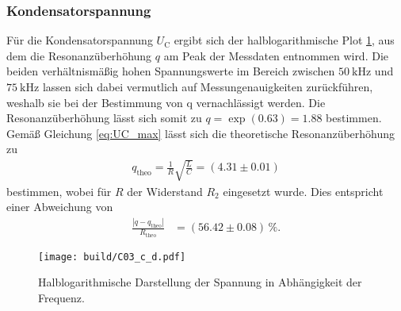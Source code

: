 \subsubsection{Kondensatorspannung}
Für die Kondensatorspannung $U_\text{C}$ ergibt sich der halblogarithmische Plot \ref{fig:plot_spannung}, aus dem die 
Resonanzüberhöhung $q$ am Peak der Messdaten entnommen wird.
Die beiden verhältnismäßig hohen Spannungswerte im Bereich zwischen $\qty{50}{\kilo\hertz}$ und $\qty{75}{\kilo\hertz}$
lassen sich dabei vermutlich auf Messungenauigkeiten zurückführen, weshalb sie bei der Bestimmung von q vernachlässigt werden.
Die Resonanzüberhöhung lässt sich somit zu $q = \exp(0.63) = 1.88$ bestimmen. 
Gemäß Gleichung \eqref{eq:UC_max} lässt sich die theoretische Resonanzüberhöhung zu 
\begin{align}
    q_\text{theo} = \frac{1}{R}\sqrt{\frac{L}{C}} = (\num{4.31} \pm \num{0.01})
\end{align}
bestimmen, wobei für $R$ der Widerstand $R_2$ eingesetzt wurde.
Dies entspricht einer Abweichung von
\begin{align*}
    \frac{|q - q_\text{theo}|}{R_\text{theo}} &= (\num[]{56.42} \pm \num[]{0.08}) \, \%.
\end{align*}


\begin{figure}[H]
    \centering
    \texttt{[image: build/C03\_c\_d.pdf]}
    \caption{Halblogarithmische Darstellung der Spannung in Abhängigkeit der Frequenz.}
    \label{fig:plot_spannung}
\end{figure}

